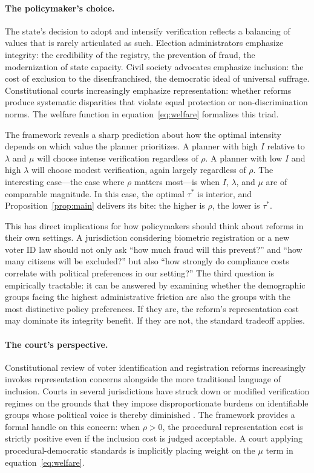 \paragraph{The policymaker's choice.} The state's decision to adopt and intensify verification reflects a balancing of values that is rarely articulated as such. Election administrators emphasize integrity: the credibility of the registry, the prevention of fraud, the modernization of state capacity. Civil society advocates emphasize inclusion: the cost of exclusion to the disenfranchised, the democratic ideal of universal suffrage. Constitutional courts increasingly emphasize representation: whether reforms produce systematic disparities that violate equal protection or non-discrimination norms. The welfare function in equation~\eqref{eq:welfare} formalizes this triad.

The framework reveals a sharp prediction about how the optimal intensity depends on which value the planner prioritizes. A planner with high $I$ relative to $\lambda$ and $\mu$ will choose intense verification regardless of $\rho$. A planner with low $I$ and high $\lambda$ will choose modest verification, again largely regardless of $\rho$. The interesting case---the case where $\rho$ matters most---is when $I$, $\lambda$, and $\mu$ are of comparable magnitude. In this case, the optimal $\tau^*$ is interior, and Proposition~\ref{prop:main} delivers its bite: the higher is $\rho$, the lower is $\tau^*$.

This has direct implications for how policymakers should think about reforms in their own settings. A jurisdiction considering biometric registration or a new voter ID law should not only ask ``how much fraud will this prevent?'' and ``how many citizens will be excluded?'' but also ``how strongly do compliance costs correlate with political preferences in our setting?'' The third question is empirically tractable: it can be answered by examining whether the demographic groups facing the highest administrative friction are also the groups with the most distinctive policy preferences. If they are, the reform's representation cost may dominate its integrity benefit. If they are not, the standard tradeoff applies.

\paragraph{The court's perspective.} Constitutional review of voter identification and registration reforms increasingly invokes representation concerns alongside the more traditional language of inclusion. Courts in several jurisdictions have struck down or modified verification regimes on the grounds that they impose disproportionate burdens on identifiable groups whose political voice is thereby diminished \citep{ECJVotingRights2017, USSCSCotusVoting2013}. The framework provides a formal handle on this concern: when $\rho > 0$, the procedural representation cost is strictly positive even if the inclusion cost is judged acceptable. A court applying procedural-democratic standards is implicitly placing weight on the $\mu$ term in equation~\eqref{eq:welfare}.

